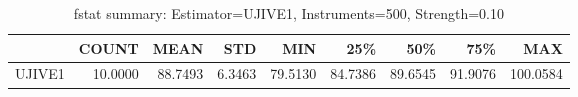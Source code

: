 \begin{table}[ht]
\centering
\caption{fstat summary: Estimator=UJIVE1, Instruments=500, Strength=0.10}
\begin{tabular}{lrrrrrrrr}
\toprule
 & COUNT & MEAN & STD & MIN & 25\% & 50\% & 75\% & MAX \\
\midrule
UJIVE1 & 10.0000 & 88.7493 & 6.3463 & 79.5130 & 84.7386 & 89.6545 & 91.9076 & 100.0584 \\
\bottomrule
\end{tabular}
\end{table}
